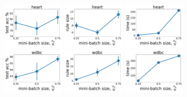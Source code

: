\begin{figure}[t]
	\centering
	
	\subfloat
	{\includegraphics[width=0.27\textwidth]{figures/interpretability/relaxed-cnf/heart_test_accuracy_vary_subsamplesize.pdf}}
	\subfloat
	{\includegraphics[width=0.27\textwidth]{figures/interpretability/relaxed-cnf/heart_rule_size_vary_subsamplesize.pdf}}
	\subfloat
	{\includegraphics[width=0.27\textwidth]{figures/interpretability/relaxed-cnf/heart_time_vary_subsamplesize.pdf}} 
	\\
	
	\subfloat
	{\includegraphics[width=0.27\textwidth]{figures/interpretability/relaxed-cnf/wdbc_test_accuracy_vary_subsamplesize.pdf}}
	\subfloat
	{\includegraphics[width=0.27\textwidth]{figures/interpretability/relaxed-cnf/wdbc_rule_size_vary_subsamplesize.pdf}}
	\subfloat
	{\includegraphics[width=0.27\textwidth]{figures/interpretability/relaxed-cnf/wdbc_time_vary_subsamplesize.pdf}} 
	\\
	

\end{figure}
